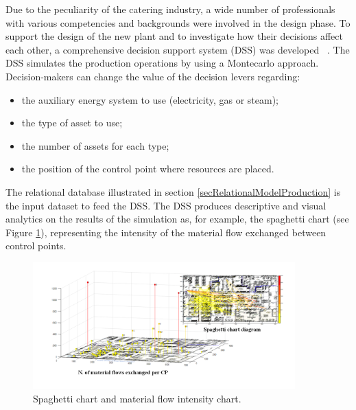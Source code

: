Due to the peculiarity of the catering industry, a wide number of professionals with various competencies and backgrounds were involved in the design phase. To support the design of the new plant and to investigate how their decisions affect each other, a comprehensive decision support system (DSS) was developed ~\cite{Tufano2018_cekiDesign}. The DSS simulates the production operations by using a Montecarlo approach. Decision-makers can change the value of the decision levers regarding:

\begin{itemize}
    \item the auxiliary energy system to use (electricity, gas or steam);
    \item the type of asset to use;
    \item the number of assets for each type;
    \item the position of the control point where resources are placed.

\end{itemize}

The relational database illustrated in section \ref{secRelationalModelProduction} is the input dataset to feed the DSS. The DSS produces descriptive and visual analytics on the results of the simulation as, for example, the spaghetti chart (see Figure \ref{fig_prod_CAMST_spaghettiChart}), representing the intensity of the material flow exchanged between control points.

\begin{figure}[hbt!]
\centering
\includegraphics[width=0.9\textwidth]{sectionProduction/design_plant_figures/fig_prod_CAMST_spaghettiChart.png}
\captionsetup{type=figure}
\caption{Spaghetti chart and material flow intensity chart.}
\label{fig_prod_CAMST_spaghettiChart}
\end{figure}

